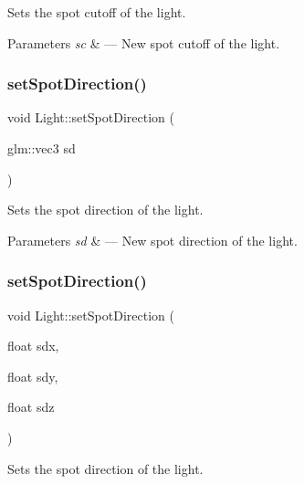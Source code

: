 Sets the spot cutoff of the light. 


\begin{DoxyParams}{Parameters}
{\em sc} & --- New spot cutoff of the light. \\
\hline
\end{DoxyParams}
\mbox{\label{class_light_a87d7f0236ff86b69ffda8852c500da2c}} 
\subsubsection{\texorpdfstring{set\+Spot\+Direction()}{setSpotDirection()}\hspace{0.1cm}{\footnotesize\ttfamily [1/2]}}
{\footnotesize\ttfamily void Light\+::set\+Spot\+Direction (\begin{DoxyParamCaption}\item[{glm\+::vec3}]{sd }\end{DoxyParamCaption})}



Sets the spot direction of the light. 


\begin{DoxyParams}{Parameters}
{\em sd} & --- New spot direction of the light. \\
\hline
\end{DoxyParams}
\mbox{\label{class_light_adadb13791f70ee5acb8767a3169c2ef1}} 
\subsubsection{\texorpdfstring{set\+Spot\+Direction()}{setSpotDirection()}\hspace{0.1cm}{\footnotesize\ttfamily [2/2]}}
{\footnotesize\ttfamily void Light\+::set\+Spot\+Direction (\begin{DoxyParamCaption}\item[{float}]{sdx,  }\item[{float}]{sdy,  }\item[{float}]{sdz }\end{DoxyParamCaption})}



Sets the spot direction of the light. 


